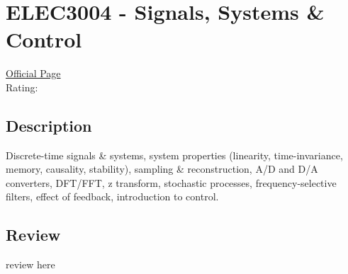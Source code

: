 \hypertarget{ELEC3004}{\section{ELEC3004 - Signals, Systems \& Control}}

\large
\textcolor{turbo_purple}{\href{https://my.uq.edu.au/programs-courses/course.html?course_code=ELEC3004}{Official Page}} \\
Rating: \cstar\cstar\cstar\cstar\ostar

\normalsize
\subsection*{Description}
Discrete-time signals \& systems, system properties (linearity, time-invariance, memory, causality, stability), sampling \& reconstruction, A/D and D/A converters, DFT/FFT, z transform, stochastic processes, frequency-selective filters, effect of feedback, introduction to control.

\subsection*{Review}
review here
